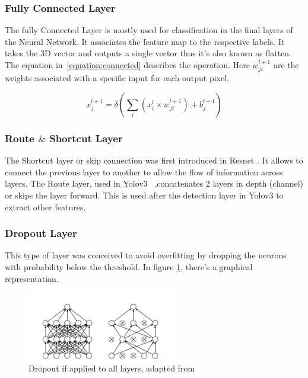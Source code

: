\subsubsection{Fully Connected Layer}

\quad The fully Connected Layer is mostly used for classification in the final layers of the Neural Network. It associates the feature map to the respective labels.
It takes the 3D vector and outputs a single vector thus it's also known as flatten.
 The equation in~\ref{equation:connected} describes the operation. Here $w_{ji}^{l+1}$ are the weights
 associated with a specific input for each output pixel.



\begin{equation} \label{equation:connected}
     \displaystyle x_{j}^{l+1}=\delta (\sum_{i}(x_{i}^{l} \times w_{ji}^{l+1})+ b_{j}^{l+1})
 \end{equation}
 


\subsubsection{Route $\&$ Shortcut Layer}

\quad The Shortcut layer or skip connection was first introduced in Resnet \cite{resnet}.
It allows to connect the previous layer to another to allow the flow of information across layers.
The Route layer, used in Yolov3~\cite{yolov3}
,concatenates 2 layers in depth (channel) or skips the layer forward. This is used after the detection layer in Yolov3 to extract other features.

\subsubsection{Dropout Layer}

\quad This type of layer was conceived to avoid overfitting \cite{Dropout}
by dropping the neurons with probability below the threshold. In figure \ref{figure:Dropout}, there's a
graphical representation.
\begin{figure}[!htbp]
    \centering
    \includegraphics[width=0.6\textwidth]{Figures/dropout.png}
    \caption{Dropout if applied to all layers, adapted from~\cite{Dropout}}
    \label{figure:Dropout}
\end{figure} 

